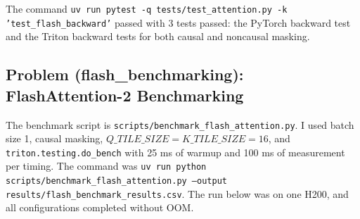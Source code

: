 \documentclass[11pt]{article}
\newcommand{\codepath}[1]{\texttt{#1}}
\newcommand{\testcmd}[1]{\texttt{#1}}
\begin{document}
The command \testcmd{uv run pytest -q tests/test\_attention.py -k 'test\_flash\_backward'} passed with 3 tests passed: the PyTorch backward test and the Triton backward tests for both causal and noncausal masking.

\subsection{Problem (flash\_benchmarking): FlashAttention-2 Benchmarking}

The benchmark script is \codepath{scripts/benchmark\_flash\_attention.py}. I used batch size 1, causal masking, $Q\_TILE\_SIZE=K\_TILE\_SIZE=16$, and \codepath{triton.testing.do\_bench} with 25 ms of warmup and 100 ms of measurement per timing. The command was \testcmd{uv run python scripts/benchmark\_flash\_attention.py --output results/flash\_benchmark\_results.csv}. The run below was on one H200, and all configurations completed without OOM.
\end{document}
